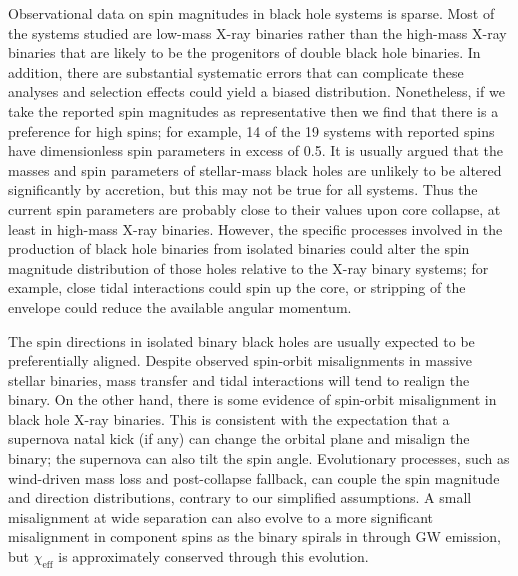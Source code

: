 \documentclass{nature-arxiv}
\newcommand{\chieff}{\chi_\mathrm{eff}}
\begin{document}
Observational data on spin magnitudes in black hole systems is
sparse\cite{2015PhR...548....1M}.  Most of the systems studied are
low-mass X-ray binaries rather than the high-mass X-ray binaries that
are likely to be the progenitors of double black hole binaries.  In
addition, there are substantial systematic errors that can complicate
these analyses\cite{2015PhR...548....1M} and selection effects could
yield a biased distribution. Nonetheless, if we take the reported spin
magnitudes as representative then we find that there is a preference
for high spins; for example, 14 of the 19 systems with reported spins
have dimensionless spin parameters in excess of 0.5.  It is usually
argued that the masses and spin parameters of stellar-mass black holes
are unlikely to be altered significantly by
accretion\cite{1999MNRAS.305..654K}, but this may not be true for all
systems\cite{2015ApJ...800...17F}.  Thus the current spin parameters
are probably close to their values upon core collapse, at least in
high-mass X-ray binaries.  However, the specific processes involved in
the production of black hole binaries from isolated binaries could
alter the spin magnitude distribution of those holes relative to the
X-ray binary systems; for example, close tidal interactions could spin
up the core, or stripping of the envelope could reduce the available
angular
momentum\cite{2016MNRAS.462..844K,2017arXiv170200885Z,2017arXiv170203952H}.

The spin directions in isolated binary black
holes\cite{TutukovYungelson:1993,2016Natur.534..512B,Stevenson:2017,MandeldeMink:2016,Marchant:2016}
are usually expected to be preferentially aligned.  Despite observed
spin-orbit misalignments in massive stellar
binaries\cite{Albrecht:2009}, mass transfer and tidal interactions
will tend to realign the binary.  On the other hand, there is some
evidence of spin-orbit misalignment in black hole X-ray
binaries\cite{Martin:2008b,MorningstarMiller:2014}.  This is
consistent with the expectation that a supernova natal kick (if any)
can change the orbital plane and misalign the
binary\cite{2000ApJ...541..319K}; the supernova can also tilt the spin
angle\cite{2011ApJ...742...81F}.  Evolutionary processes, such as
wind-driven mass loss and post-collapse fallback, can couple the spin
magnitude and direction distributions, contrary to our simplified
assumptions.  A small misalignment at wide separation can also evolve
to a more significant misalignment in component spins as the binary
spirals in through \ac{GW} emission\cite{2015PhRvD..92f4016G}, but
$\chieff$ is approximately conserved through this evolution.
\end{document}
